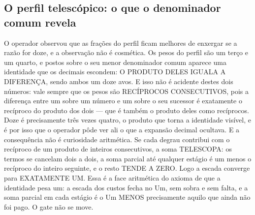 \documentclass[11pt]{article}
\theoremstyle{definition}\newtheorem{deriv}{Derivação}
\begin{document}
\subsection*{O perfil telesc\'opico: o que o denominador comum revela}O operador observou que as fra\c{c}\~oes do perfil ficam melhores de enxergar se a raz\~ao for doze, e a observa\c{c}\~ao n\~ao \'e cosm\'etica. Os pesos do perfil s\~ao um ter\c{c}o e um quarto, e postos sobre o seu menor denominador comum aparece uma identidade que os decimais escondem: O PRODUTO DELES IGUALA A DIFEREN\c{C}A, sendo ambos um doze avos. E isso n\~ao \'e acidente destes dois n\'umeros: vale sempre que os pesos s\~ao REC\'IPROCOS CONSECUTIVOS, pois a diferen\c{c}a entre um sobre um n\'umero e um sobre o seu sucessor \'e exatamente o rec\'iproco do produto dos dois --- que \'e tamb\'em o produto deles como rec\'iprocos. Doze \'e precisamente tr\^es vezes quatro, o produto que torna a identidade vis\'ivel, e \'e por isso que o operador p\^ode ver ali o que a expans\~ao decimal ocultava. E a consequ\^encia n\~ao \'e curiosidade aritm\'etica. Se cada degrau contribui com o rec\'iproco de um produto de inteiros consecutivos, a soma TELESCOPA: os termos se cancelam dois a dois, a soma parcial at\'e qualquer est\'agio \'e um menos o rec\'iproco do inteiro seguinte, e o resto TENDE A ZERO. Logo a escada converge para EXATAMENTE UM. Essa \'e a face aritm\'etica do axioma de que a identidade pesa um: a escada dos custos fecha no Um, sem sobra e sem falta, e a soma parcial em cada est\'agio \'e o Um MENOS precisamente aquilo que ainda n\~ao foi pago. O gate n\~ao se move.
\end{document}
